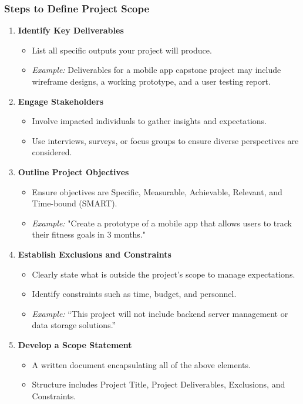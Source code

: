 \documentclass{beamer}
\begin{document}
\begin{frame}[fragile]
    \frametitle{Steps to Define Project Scope}
    \begin{enumerate}
        \item \textbf{Identify Key Deliverables}
            \begin{itemize}
                \item List all specific outputs your project will produce.
                \item \textit{Example:} Deliverables for a mobile app capstone project may include wireframe designs, a working prototype, and a user testing report.
            \end{itemize}
        
        \item \textbf{Engage Stakeholders}
            \begin{itemize}
                \item Involve impacted individuals to gather insights and expectations.
                \item Use interviews, surveys, or focus groups to ensure diverse perspectives are considered.
            \end{itemize}
        
        \item \textbf{Outline Project Objectives}
            \begin{itemize}
                \item Ensure objectives are Specific, Measurable, Achievable, Relevant, and Time-bound (SMART).
                \item \textit{Example:} "Create a prototype of a mobile app that allows users to track their fitness goals in 3 months."
            \end{itemize}
        
        \item \textbf{Establish Exclusions and Constraints}
            \begin{itemize}
                \item Clearly state what is outside the project's scope to manage expectations.
                \item Identify constraints such as time, budget, and personnel.
                \item \textit{Example:} “This project will not include backend server management or data storage solutions.”
            \end{itemize}
        
        \item \textbf{Develop a Scope Statement}
            \begin{itemize}
                \item A written document encapsulating all of the above elements.
                \item Structure includes Project Title, Project Deliverables, Exclusions, and Constraints.
            \end{itemize}
    \end{enumerate}
\end{frame}
\end{document}
